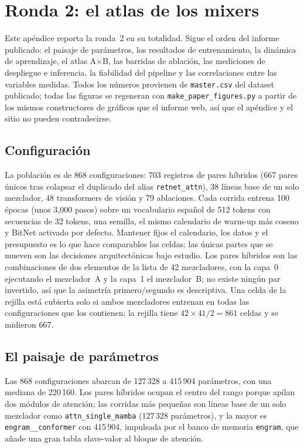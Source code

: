 \section{Ronda 2: el atlas de los mixers}
\label{sec:annex-experiment-2}

Este apéndice reporta la ronda~2 en su totalidad. Sigue el orden del informe publicado: el paisaje de parámetros, los resultados de entrenamiento, la dinámica de aprendizaje, el atlas A$\times$B, las barridas de ablación, las mediciones de despliegue e inferencia, la fiabilidad del pipeline y las correlaciones entre las variables medidas. Todos los números provienen de \texttt{master.csv} del dataset publicado; todas las figuras se regeneran con \texttt{make\_paper\_figures.py} a partir de los mismos constructores de gráficos que el informe web, así que el apéndice y el sitio no pueden contradecirse.

\subsection{Configuración}

La población es de 868 configuraciones: 703 registros de pares híbridos (667 pares únicos tras colapsar el duplicado del alias \texttt{retnet\_attn}), 38 líneas base de un solo mezclador, 48 transformers de visión y 79 ablaciones. Cada corrida entrena 100 épocas (unos 3{,}000 pasos) sobre un vocabulario español de 512 tokens con secuencias de 32 tokens, una semilla, el mismo calendario de warm-up más coseno y BitNet activado por defecto. Mantener fijos el calendario, los datos y el presupuesto es lo que hace comparables las celdas: las únicas partes que se mueven son las decisiones arquitectónicas bajo estudio. Los pares híbridos son las combinaciones de dos elementos de la lista de 42 mezcladores, con la capa~0 ejecutando el mezclador~A y la capa~1 el mezclador~B; no existe ningún par invertido, así que la asimetría primero/segundo es descriptiva. Una celda de la rejilla está cubierta solo si ambos mezcladores entrenan en todas las configuraciones que los contienen: la rejilla tiene $42\times41/2 = 861$ celdas y se midieron 667.

\subsection{El paisaje de parámetros}

Las 868 configuraciones abarcan de 127\,328 a 415\,904 parámetros, con una mediana de 220\,160. Los pares híbridos ocupan el centro del rango porque apilan dos módulos de atención; las corridas más pequeñas son líneas base de un solo mezclador como \texttt{attn\_single\_mamba} (127\,328 parámetros), y la mayor es \texttt{engram\_\_conformer} con 415\,904, impulsada por el banco de memoria \texttt{engram}, que añade una gran tabla clave-valor al bloque de atención.

